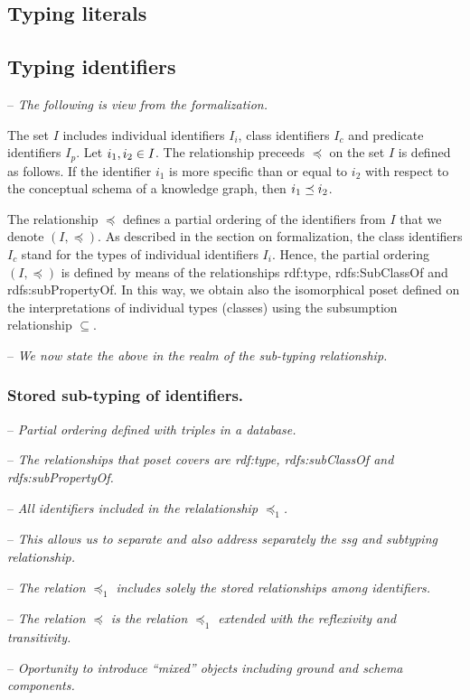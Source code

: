\documentclass[runningheads]{llncs}
\newcommand{\nl}{\hfill\break}
\newcommand{\notes}[1]{\noindent\begin{small}-- \emph{#1}\\\end{small}}
\begin{document}
\subsection{Typing literals}



\subsection{Typing identifiers}

\notes{The following is view from the formalization.}

The set $I$ includes individual identifiers $I_i$, class identifiers
$I_c$ and predicate identifiers $I_p$. Let $i_1,i_2\in\/I$. The
relationship preceeds $\preceq$ on the set $I$ is defined as
follows. If the identifier $i_1$ is more specific than or equal to
$i_2$ with respect to the conceptual schema of a knowledge graph, then
$i_1\preceq\/i_2$.

The relationship $\preceq$ defines a partial ordering of the
identifiers from $I$ that we denote $(I,\preceq)$. As described in the
section on formalization, the class identifiers $I_c$ stand for the
types of individual identifiers $I_i$. Hence, the partial ordering
$(I,\preceq)$ is defined by means of the relationships
rdf:type, rdfs:SubClassOf and rdfs:subPropertyOf. In this way, we
obtain also the isomorphical poset defined on the interpretations of
individual types (classes) using the subsumption relationship
$\subseteq$.

\notes{We now state the above in the realm of the sub-typing relationship.}

\subsubsection{Stored sub-typing of identifiers.}\nl

\notes{Partial ordering defined with triples in a database.}
\notes{The relationships that poset covers are rdf:type, rdfs:subClassOf and rdfs:subPropertyOf. }
\notes{All identifiers included in the relalationship $\preceq_1$.}
\notes{This allows us to separate and also address separately the ssg and subtyping relationship.}
\notes{The relation $\preceq_1$ includes solely the \emph{stored} relationships among identifiers.}
\notes{The relation $\preceq$ is the relation $\preceq_1$ extended with the reflexivity and transitivity.}

\notes{Oportunity to introduce ``mixed'' objects including ground and schema components.}
\end{document}
